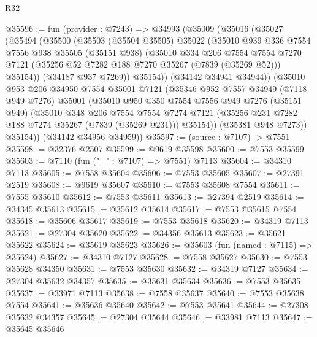 \begin{lexlean}{R32}
\begin{coremodule}
@35596 := fun (provider : @7243) =>
  @34993
    (@35009
      (@35016
        (@35027
          (@35494
            (@35500
              (@35503
                (@35504 @35505)
                @35022
                (@35010
                  @939
                  @336
                  @7554
                  @7556
                  @938
                  @35505
                  (@35151 @938)
                  (@35010
                    @334
                    @206
                    @7554
                    @7554
                    @7270
                    @7121
                    (@35256 @52 @7282 @188 @7270 @35267 (@7839 (@35269 @52)))
                    @35154))
                (@34187 @937 @7269))
              @35154))
          (@34142 @34941 @34944))
        (@35010
          @953
          @206
          @34950
          @7554
          @35001
          @7121
          (@35346
            @952
            @7557
            @34949
            (@7118 @949 @7276)
            @35001
            (@35010
              @950
              @350
              @7554
              @7556
              @949
              @7276
              (@35151 @949)
              (@35010
                @348
                @206
                @7554
                @7554
                @7274
                @7121
                (@35256 @231 @7282 @188 @7274 @35267 (@7839 (@35269 @231)))
                @35154))
            (@35381 @948 @7273))
          @35154))
      (@34142 @34956 @34959))
@35597 := (source : @7107) -> @7551
@35598 := @32376 @2507
@35599 := @9619 @35598
@35600 := @7553 @35599
@35603 := @7110 (fun ("_" : @7107) => @7551) @7113
@35604 := @34310 @7113
@35605 := @7558 @35604
@35606 := @7553 @35605
@35607 := @27391 @2519
@35608 := @9619 @35607
@35610 := @7553 @35608 @7554
@35611 := @7555 @35610
@35612 := @7553 @35611
@35613 := @27394 @2519
@35614 := @34345 @35613
@35615 := @35612 @35614
@35617 := @7553 @35615 @7554
@35618 := @35606 @35617
@35619 := @7553 @35618
@35620 := @34319 @7113
@35621 := @27304 @35620
@35622 := @34356 @35613
@35623 := @35621 @35622
@35624 := @35619 @35623
@35626 := @35603 (fun (named : @7115) => @35624)
@35627 := @34310 @7127
@35628 := @7558 @35627
@35630 := @7553 @35628 @34350
@35631 := @7553 @35630
@35632 := @34319 @7127
@35634 := @27304 @35632 @34357
@35635 := @35631 @35634
@35636 := @7553 @35635
@35637 := @33971 @7113
@35638 := @7558 @35637
@35640 := @7553 @35638 @7554
@35641 := @35636 @35640
@35642 := @7553 @35641
@35644 := @27308 @35632 @34357
@35645 := @27304 @35644
@35646 := @33981 @7113
@35647 := @35645 @35646

\end{coremodule}
\end{lexlean}
